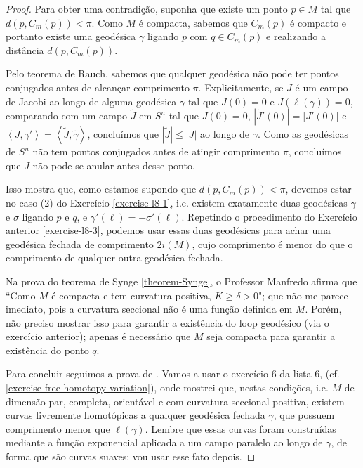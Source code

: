 \begin{proof}
Para obter uma contradição, suponha que existe um ponto $p \in M$ tal que
 $d(p, C_m(p))<\pi$. Como $M$ é compacta, sabemos que $C_m(p)$ é compacto e
portanto existe uma geodésica $\gamma$ ligando $p$ com $q \in C_m(p)$ e
realizando a distância $d(p,C_m(p))$.

Pelo teorema de Rauch, sabemos que qualquer geodésica não pode ter pontos
conjugados antes de alcançar comprimento $\pi$. Explicitamente, se $J$ é um
campo de Jacobi ao longo de alguma geodésica $\gamma$ tal que $J(0)=0$ e 
$J(\ell(\gamma))=0$, comparando com um campo $\tilde{J}$ em $S^n$ tal que
 $\tilde{J}(0)=0$, $|\tilde{J}'(0)|=|J'(0)|$ e 
$\left<J,\gamma'\right>=\left<\tilde{J},\tilde{\gamma}\right>$, concluímos que
 $|\tilde{J}|\leq |J|$ ao longo de $\gamma$. Como as geodésicas de $S^n$ não
 tem pontos conjugados antes de atingir comprimento $\pi$, concluímos que 
$J$ não pode se anular antes desse ponto.

Isso mostra que, como estamos supondo que $d(p,C_m(p))<\pi$, devemos estar no
caso (2) do Exercício \ref{exercise-l8-1}, i.e. existem exatamente duas
geodésicas $\gamma$ e $\sigma$ ligando $p$ e $q$, e
$\gamma'(\ell)=-\sigma'(\ell)$. Repetindo o procedimento do Exercício anterior
 \ref{exercise-l8-3}, podemos usar essas duas geodésicas para achar uma 
geodésica fechada de comprimento $2i(M)$, cujo comprimento é menor do que o
comprimento de qualquer outra geodésica fechada.

\begin{remark}
\label{remark-curvatura-positiva-implica-maior-que-constante-positiva}
Na prova do teorema de Synge \ref{theorem-Synge}, o Professor
Manfredo afirma que ``Como $M$ é compacta e tem curvatura positiva, $K\geq
\delta>0$"; que não me parece imediato, pois a curvatura seccional não é uma
função definida em $M$. Porém, não preciso mostrar isso para garantir a
existência do loop geodésico (via o exercício anterior); apenas é necessário 
que $M$ seja compacta para garantir a existência do ponto $q$.
\end{remark}

\medskip

Para concluir seguimos a prova de \cite{doc}. Vamos a usar o exercício 6 da
lista 6, (cf. \ref{exercise-free-homotopy-variation}), onde mostrei que, nestas condições, i.e.
$M$ de dimensão par, completa, orientável e com curvatura seccional positiva,
existem curvas livremente homotópicas a qualquer geodésica fechada $\gamma$, que
possuem comprimento menor que $\ell(\gamma)$. Lembre que essas curvas foram
construídas mediante a função exponencial aplicada a um campo paralelo ao longo
de $\gamma$, de forma que são curvas suaves; vou usar esse fato depois.


\end{proof}
